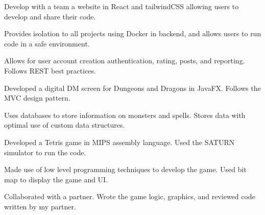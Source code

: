 \documentclass[letterpaper,10pt]{article}
\begin{document}
    \begin{resume_list}
        \item Develop with a team a website in React and tailwindCSS allowing users to develop and share their code.
        \item Provides isolation to all projects using Docker in backend, and allows users to run code in a safe environment.
        \item Allows for user account creation authentication, rating, posts, and reporting. Follows REST best practices.
    \end{resume_list}
    \begin{resume_list}
        \item Developed a digital DM screen for Dungeons and Dragons in JavaFX. Follows the MVC design pattern.
        \item Uses databases to store information on monsters and spells. Stores data with optimal use of custom data structures.        
    \end{resume_list}
    \begin{resume_list}
        \item Developed a Tetris game in MIPS assembly language. Used the SATURN simulator to run the code.
        \item Made use of low level programming techniques to develop the game. Used bit map to display the game and UI.
        \item Collaborated with a partner. Wrote the game logic, graphics, and reviewed code written by my partner.
    \end{resume_list}
    


    
\end{document}
